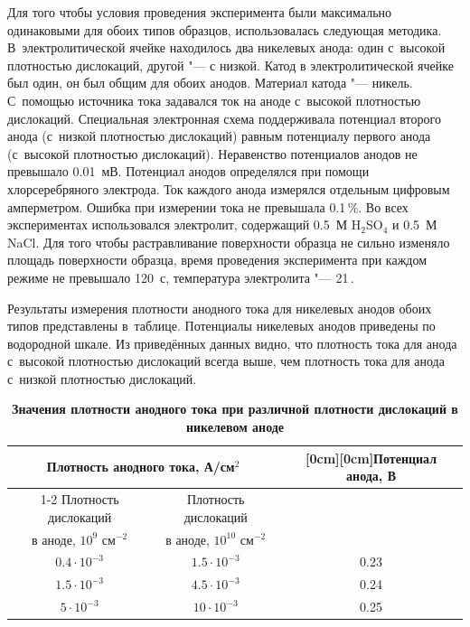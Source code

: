 Для того чтобы условия проведения эксперимента были максимально одинаковыми для обоих типов образцов, использовалась следующая методика. 
В~электролитической ячейке находилось два никелевых анода: один с~высокой плотностью дислокаций, другой "--- с низкой. 
Катод в электролитической ячейке был один, он был общим для обоих анодов. 
Материал катода "--- никель. 
С~помощью источника тока задавался ток на аноде с~высокой плотностью дислокаций.
Специальная электронная схема поддерживала потенциал второго анода (с~низкой плотностью дислокаций) равным потенциалу первого анода (с~высокой плотностью дислокаций). 
Неравенство потенциалов анодов не превышало 0.01~мВ. 
Потенциал анодов определялся при помощи хлорсеребряного электрода. 
Ток каждого анода измерялся отдельным цифровым амперметром. 
Ошибка при измерении тока не превышала 0.1\,\%. 
Во всех экспериментах использовался электролит, содержащий 0.5~М H$_2$SO$_4$ и 0.5~М NaCl. 
Для того чтобы растравливание поверхности образца не сильно изменяло площадь поверхности образца, время проведения эксперимента при каждом режиме не превышало 120~с, температура электролита "--- 21\,\textcelsius.


\smallskip

Результаты измерения плотности анодного тока для никелевых анодов обоих типов представлены в~таблице. Потенциалы никелевых анодов приведены по водородной шкале. 
Из приведённых данных видно, что плотность тока для анода с~высокой плотностью дислокаций всегда выше, чем плотность тока для анода с~низкой плотностью дислокаций.

\begin{table}[t!]\small \centering
\begin{minipage}{.84\textwidth}
\centering
\caption*{\bf Значения плотности анодного тока при различной плотности дислокаций в никелевом аноде}
\vspace{-3mm}
\begin{tabular}{c|c|c} \hline
\multicolumn{2}{c|}{\footnotesize Плотность анодного тока, А/см$^2$}&
\raisebox{-3ex}[0cm][0cm]{\footnotesize Потенциал анода, В} \\ 
\cline{1-2}
\footnotesize Плотность дислокаций & \footnotesize  Плотность дислокаций &  \\
\footnotesize в аноде, $10^9$ см$^{-2}$ & \footnotesize  в аноде, $10^{10}$ см$^{-2}$ & \\ \hline
\rule{0mm}{12pt}%
$ 0.4 \cdot 10^{-3}$ & $1.5 \cdot 10^{-3}$ & 0.23 \\ 
$1.5 \cdot 10^{-3}$  & $4.5 \cdot 10^{-3}$ & 0.24 \\ 
$5 \cdot 10^{-3}$    & $10 \cdot 10^{-3}$ & 0.25 \\ \hline
\end{tabular}
\end{minipage}
\end{table}


